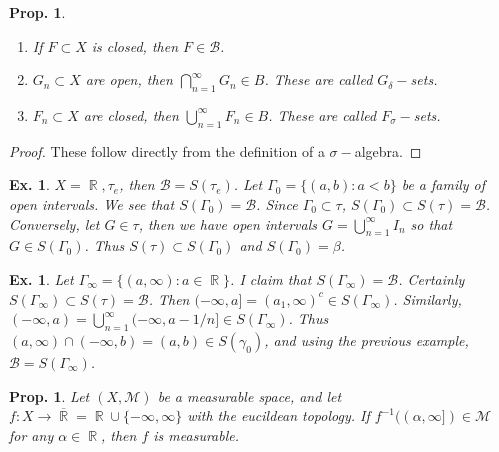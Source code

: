 \documentclass[12pt, a4paper]{book}
\DeclareMathOperator{\R}{\mathbb{R}}
\newtheorem{proposition}[theorem]{Prop.}
\newtheorem{example}[theorem]{Ex.}
\theoremstyle{nonumberplain}
\newtheorem{proof}{Proof}
\begin{document}
\begin{proposition}
    \begin{enumerate}[nolistsep]
        \item If $F\subset X$ is closed, then $F\in\mathcal{B}$.
        \item $G_n\subset X$ are open, then $\bigcap_{n=1}^\infty G_n\in B$.
            These are called $G_\delta-$sets.
        \item $F_n\subset X$ are closed, then $\bigcup_{n=1}^\infty F_n\in B$.
            These are called $F_\sigma-$sets.
    \end{enumerate}
\end{proposition}
\begin{proof}
    These follow directly from the definition of a $\sigma-$algebra.
\end{proof}
\begin{example}
    $X=\R,\tau_e$, then $\mathcal{B}=S(\tau_e)$.
    Let $\Gamma_0=\{(a,b):a<b\}$ be a family of open intervals.
    We see that $S(\Gamma_0)=\mathcal{B}$.
    Since $\Gamma_0\subset\tau$, $S(\Gamma_0)\subset S(\tau)=\mathcal{B}$.
    Conversely, let $G\in\tau$, then we have open intervals $G=\bigcup_{n=1}^\infty I_n$ so that $G\in S(\Gamma_0)$.
    Thus $S(\tau)\subset S(\Gamma_0)$ and $S(\Gamma_0)=\beta$.
\end{example}
\begin{example}
    Let $\Gamma_\infty=\{(a,\infty):a\in\R\}$.
    I claim that $S(\Gamma_\infty)=\mathcal{B}$.
    Certainly $S(\Gamma_\infty)\subset S(\tau)=\mathcal{B}$.
    Then $(-\infty,a]=(a_1,\infty)^c\in S(\Gamma_\infty)$.%
    Similarly, $(-\infty,a)=\bigcup_{n=1}^\infty (-\infty,a-1/n]\in S(\Gamma_\infty)$.%
    Thus $(a,\infty)\cap(-\infty,b)=(a,b)\in S(\gamma_0)$, and using the previous example, $\mathcal{B}=S(\Gamma_\infty)$.
\end{example}
\begin{proposition}
    Let $(X,\mathcal{M})$ be a measurable space, and let $f:X\to\overline{\R}=\R\cup\{-\infty,\infty\}$ with the eucildean topology.
    If $f^{-1}((\alpha,\infty])\in\mathcal{M}$ for any $\alpha\in\R$, then $f$ is measurable. %
\end{proposition}
\end{document}
